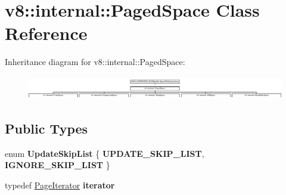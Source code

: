 \hypertarget{classv8_1_1internal_1_1PagedSpace}{}\section{v8\+:\+:internal\+:\+:Paged\+Space Class Reference}
\label{classv8_1_1internal_1_1PagedSpace}
Inheritance diagram for v8\+:\+:internal\+:\+:Paged\+Space\+:\begin{figure}[H]
\begin{center}
\leavevmode
\includegraphics[height=1.033846cm]{classv8_1_1internal_1_1PagedSpace}
\end{center}
\end{figure}
\subsection*{Public Types}
\begin{DoxyCompactItemize}
\item 
\mbox{\label{classv8_1_1internal_1_1PagedSpace_afe936e2f7428f4db89715fd29f50e2f1}} 
enum {\bfseries Update\+Skip\+List} \{ {\bfseries U\+P\+D\+A\+T\+E\+\_\+\+S\+K\+I\+P\+\_\+\+L\+I\+ST}, 
{\bfseries I\+G\+N\+O\+R\+E\+\_\+\+S\+K\+I\+P\+\_\+\+L\+I\+ST}
 \}
\item 
\mbox{\label{classv8_1_1internal_1_1PagedSpace_a32449f251084c73afd1266172058621c}} 
typedef \mbox{\hyperlink{classv8_1_1internal_1_1PageIteratorImpl}{Page\+Iterator}} {\bfseries iterator}
\end{DoxyCompactItemize}
